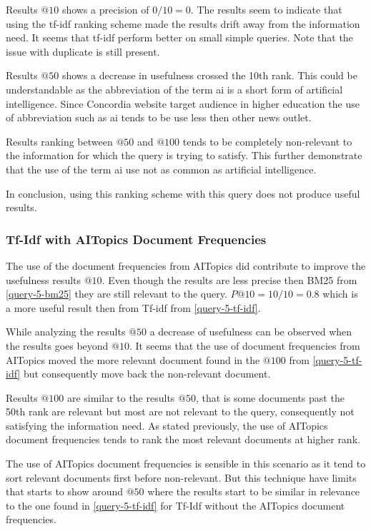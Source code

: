 \par Results $@10$ shows a precision of $0/10=0$. The results seem to indicate that using the tf-idf ranking scheme made the results drift away from the information need. It seems that tf-idf perform better on small simple queries. Note that the issue with duplicate is still present.
\par Results $@50$ shows a decrease in usefulness crossed the 10th rank. This could be understandable as the abbreviation of the term ai is a short form of artificial intelligence. Since Concordia website target audience in higher education the use of abbreviation such as ai tends to be use less then other news outlet.
\par Results ranking between $@50$ and $@100$ tends to be completely non-relevant to the information for which the query is trying to satisfy. This further demonstrate that the use of the term ai use not as common as artificial intelligence. 
\par In conclusion, using this ranking scheme with this query does not produce useful results.

\subsubsection{Tf-Idf with AITopics Document Frequencies} \label{query-5-tf-idf-aitopics}

\par The use of the document frequencies from AITopics did contribute to improve the usefulness results $@10$. Even though the results are less precise then BM25 from \ref{query-5-bm25} they are still relevant to the query. $P@10=10/10=0.8$ which is a more useful result then from Tf-idf from \ref{query-5-tf-idf}.
\par While analyzing the results $@50$ a decrease of usefulness can be observed when the results goes beyond $@10$. It seems that the use of document frequencies from AITopics moved the more relevant document found in the $@100$ from \ref{query-5-tf-idf} but consequently move back the non-relevant document.
\par Results $@100$ are similar to the results $@50$, that is some documents past the 50th rank are relevant but most are not relevant to the query, consequently not satisfying the information need. As stated previously, the use of AITopics document frequencies tends to rank the most relevant documents at higher rank.
\par The use of AITopics document frequencies is sensible in this scenario as it tend to sort relevant documents first before non-relevant. But this technique have limits that starts to show around $@50$ where the results start to be similar in relevance to the one found in \ref{query-5-tf-idf} for Tf-Idf without the AITopics document frequencies.

